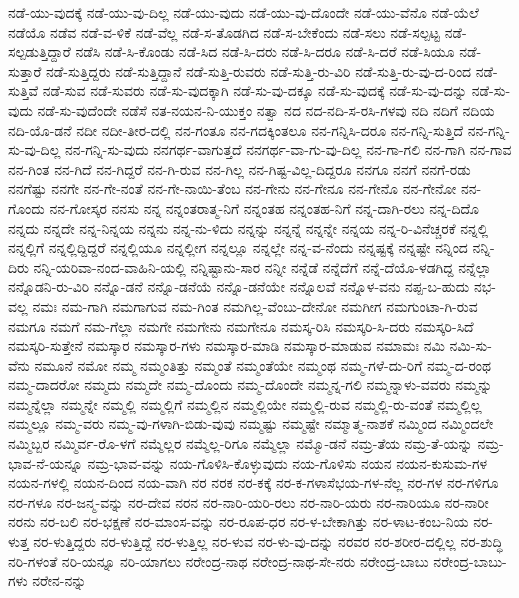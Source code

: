 {ನಡೆ-ಯು-ವುದಕ್ಕೆ
ನಡೆ-ಯು-ವು-ದಿಲ್ಲ
ನಡೆ-ಯು-ವುದು
ನಡೆ-ಯು-ವು-ದೊಂದೇ
ನಡೆ-ಯು-ವೆನೊ
ನಡೆ-ಯೆಲೆ
ನಡೆಯೊ
ನಡೆವ
ನಡೆ-ವ-ಳಿಕೆ
ನಡೆ-ವೆಲ್ಲ
ನಡೆ-ಸ-ತೊಡಗಿದ
ನಡೆ-ಸ-ಬೇಕೆಂದು
ನಡೆ-ಸಲು
ನಡೆ-ಸಲ್ಪಟ್ಟ
ನಡೆ-ಸಲ್ಪಡುತ್ತಿದ್ದಾರೆ
ನಡೆಸಿ
ನಡೆ-ಸಿ-ಕೊಂಡು
ನಡೆ-ಸಿದ
ನಡೆ-ಸಿ-ದರು
ನಡೆ-ಸಿ-ದರೂ
ನಡೆ-ಸಿ-ದರೆ
ನಡೆ-ಸಿಯೂ
ನಡೆ-ಸುತ್ತಾರೆ
ನಡೆ-ಸುತ್ತಿದ್ದರು
ನಡೆ-ಸುತ್ತಿದ್ದಾನೆ
ನಡೆ-ಸುತ್ತಿ-ರುವರು
ನಡೆ-ಸುತ್ತಿ-ರು-ವಿರಿ
ನಡೆ-ಸುತ್ತಿ-ರು-ವು-ದ-ರಿಂದ
ನಡೆ-ಸುತ್ತಿವೆ
ನಡೆ-ಸುವ
ನಡೆ-ಸುವರು
ನಡೆ-ಸು-ವುದಕ್ಕಾಗಿ
ನಡೆ-ಸು-ವು-ದಕ್ಕೂ
ನಡೆ-ಸು-ವುದಕ್ಕೆ
ನಡೆ-ಸು-ವು-ದನ್ನು
ನಡೆ-ಸು-ವುದು
ನಡೆ-ಸು-ವುದೆಂದೇ
ನಡೆಸೆ
ನತ-ನಯನ-ನಿ-ಯುಕ್ತಂ
ನತ್ವಾ
ನದ
ನದ-ನದಿ-ಸ-ರಸಿ-ಗಳವು
ನದಿ
ನದಿಗೆ
ನದಿಯ
ನದಿ-ಯೊ-ಡನೆ
ನದೀ
ನದೀ-ತೀರ-ದಲ್ಲಿ
ನನ-ಗಂತೂ
ನನ-ಗದಕ್ಕಿಂತಲೂ
ನನ-ಗನ್ನಿಸಿ-ದರೂ
ನನ-ಗನ್ನಿ-ಸುತ್ತಿದೆ
ನನ-ಗನ್ನಿ-ಸು-ವು-ದಿಲ್ಲ
ನನ-ಗನ್ನಿ-ಸು-ವುದು
ನನಗರ್ಥ-ವಾಗುತ್ತದೆ
ನನಗರ್ಥ-ವಾ-ಗು-ವು-ದಿಲ್ಲ
ನನ-ಗಾ-ಗಲಿ
ನನ-ಗಾಗಿ
ನನ-ಗಾವ
ನನ-ಗಿಂತ
ನನ-ಗಿದೆ
ನನ-ಗಿದ್ದರೆ
ನನ-ಗಿ-ರುವ
ನನ-ಗಿಲ್ಲ
ನನ-ಗಿಷ್ಟ-ವಿಲ್ಲ-ದಿದ್ದರೂ
ನನಗೂ
ನನಗೆ
ನನಗೆ-ರಡು
ನನಗೆಷ್ಟು
ನನಗೇ
ನನ-ಗೇ-ನಂತೆ
ನನ-ಗೇ-ನಾಯಿ-ತೆಂಬ
ನನ-ಗೇನು
ನನ-ಗೇನೂ
ನನ-ಗೇನೊ
ನನ-ಗೇನೋ
ನನ-ಗೊಂದು
ನನ-ಗೋಸ್ಕರ
ನನಸು
ನನ್ನ
ನನ್ನಂತರಾತ್ಮ-ನಿಗೆ
ನನ್ನಂತಹ
ನನ್ನಂತಹ-ನಿಗೆ
ನನ್ನ-ದಾಗಿ-ರಲು
ನನ್ನ-ದಿದೊ
ನನ್ನದು
ನನ್ನದೇ
ನನ್ನ-ನಿನ್ನಯ
ನನ್ನನು
ನನ್ನ-ನು-ಳಿದು
ನನ್ನನ್ನು
ನನ್ನನ್ನೆ
ನನ್ನನ್ನೇ
ನನ್ನಯ
ನನ್ನ-ರಿ-ವಿನೆಚ್ಚರಕೆ
ನನ್ನಲ್ಲಿ
ನನ್ನಲ್ಲಿಗೆ
ನನ್ನಲ್ಲಿದ್ದಿದ್ದರೆ
ನನ್ನಲ್ಲಿಯೂ
ನನ್ನಲ್ಲೀಗ
ನನ್ನಲ್ಲೂ
ನನ್ನಲ್ಲೇ
ನನ್ನ-ವ-ನೆಂದು
ನನ್ನಷ್ಟಕ್ಕೆ
ನನ್ನಷ್ಟೇ
ನನ್ನಿಂದ
ನನ್ನಿ-ದಿರು
ನನ್ನಿ-ಯರಿವಾ-ನಂದ-ವಾಹಿನಿ-ಯಲ್ಲಿ
ನನ್ನಿಷ್ಟಾನು-ಸಾರ
ನನ್ನೀ
ನನ್ನೆಡೆ
ನನ್ನೆದೆಗೆ
ನನ್ನೆ-ದೆಯೊ-ಳಡಗಿದ್ದ
ನನ್ನೆಲ್ಲಾ
ನನ್ನೊಡನಿ-ರು-ವಿರಿ
ನನ್ನೊ-ಡನೆ
ನನ್ನೊ-ಡನೆಯೆ
ನನ್ನೊ-ಡನೆಯೇ
ನನ್ನೊಲವೆ
ನನ್ನೊಳ-ವನು
ನಪ್ಪ-ಬ-ಹುದು
ನಭ-ವಲ್ಲ
ನಮಃ
ನಮ-ಗಾಗಿ
ನಮಗಾಗುವ
ನಮ-ಗಿಂತ
ನಮಗಿಲ್ಲ-ವೆಂಬು-ದೇನೋ
ನಮಗೀಗ
ನಮಗುಂಟಾ-ಗಿ-ರುವ
ನಮಗೂ
ನಮಗೆ
ನಮ-ಗೆಲ್ಲಾ
ನಮಗೇ
ನಮಗೇನು
ನಮಗೇನೂ
ನಮಸ್ಕ-ರಿಸಿ
ನಮಸ್ಕರಿ-ಸಿ-ದರು
ನಮಸ್ಕರಿ-ಸಿದೆ
ನಮಸ್ಕರಿ-ಸುತ್ತೇನೆ
ನಮಸ್ಕಾರ
ನಮಸ್ಕಾರ-ಗಳು
ನಮಸ್ಕಾರ-ಮಾಡಿ
ನಮಸ್ಕಾರ-ಮಾಡುವ
ನಮಾಮಃ
ನಮಿ
ನಮಿ-ಸು-ವೆನು
ನಮೂನೆ
ನಮೋ
ನಮ್ಮ
ನಮ್ಮಂತಿತ್ತು
ನಮ್ಮಂತೆ
ನಮ್ಮಂತೆಯೇ
ನಮ್ಮಂಥ
ನಮ್ಮ-ಗಳೆ-ದು-ರಿಗೆ
ನಮ್ಮ-ದ-ರಂಥ
ನಮ್ಮ-ದಾದರೋ
ನಮ್ಮದು
ನಮ್ಮದೇ
ನಮ್ಮ-ದೊಂದು
ನಮ್ಮ-ದೊಂದೇ
ನಮ್ಮನ್ನ-ಗಲಿ
ನಮ್ಮನ್ನಾಳು-ವವರು
ನಮ್ಮನ್ನು
ನಮ್ಮನ್ನೆಲ್ಲಾ
ನಮ್ಮನ್ನೇ
ನಮ್ಮಲ್ಲಿ
ನಮ್ಮಲ್ಲಿಗೆ
ನಮ್ಮಲ್ಲಿನ
ನಮ್ಮಲ್ಲಿಯೇ
ನಮ್ಮಲ್ಲಿ-ರುವ
ನಮ್ಮಲ್ಲಿ-ರು-ವಂತೆ
ನಮ್ಮಲ್ಲಿಲ್ಲ
ನಮ್ಮಲ್ಲೂ
ನಮ್ಮ-ವರು
ನಮ್ಮ-ವು-ಗಳಾಗಿ-ಬಿಡು-ವುವು
ನಮ್ಮಷ್ಟು
ನಮ್ಮಷ್ಟೇ
ನಮ್ಮಾತ್ಮ-ನಾಶಕೆ
ನಮ್ಮಿಂದ
ನಮ್ಮಿಂದಲೇ
ನಮ್ಮಿಬ್ಬರ
ನಮ್ಮಿರ್ವ-ರೊ-ಳಗೆ
ನಮ್ಮೆಲ್ಲರ
ನಮ್ಮೆಲ್ಲ-ರಿಗೂ
ನಮ್ಮೆಲ್ಲಾ
ನಮ್ಮೊ-ಡನೆ
ನಮ್ರ-ತೆಯ
ನಮ್ರ-ತೆ-ಯನ್ನು
ನಮ್ರ-ಭಾವ-ನೆ-ಯನ್ನೂ
ನಮ್ರ-ಭಾವ-ವನ್ನು
ನಯ-ಗೊಳಿಸಿ-ಕೊಳ್ಳುವುದು
ನಯ-ಗೊಳಿಸು
ನಯನ
ನಯನ-ಕುಸುಮ-ಗಳ
ನಯನ-ಗಳಲ್ಲಿ
ನಯನ-ದಿಂದ
ನಯ-ವಾಗಿ
ನರ
ನರಕ
ನರ-ಕಕ್ಕೆ
ನರ-ಕ-ಗಳಾಸೆಭಯ-ಗಳ-ನೆಲ್ಲ
ನರ-ಗಳ
ನರ-ಗಳಿಗೂ
ನರ-ಗಳೂ
ನರ-ಜನ್ಮ-ವನ್ನು
ನರ-ದೇವ
ನರನ
ನರ-ನಾರಿ-ಯರಿ-ರಲು
ನರ-ನಾರಿ-ಯರು
ನರ-ನಾರಿಯೂ
ನರ-ನಾರೀ
ನರನು
ನರ-ಬಲಿ
ನರ-ಭಕ್ಷಣೆ
ನರ-ಮಾಂಸ-ವನ್ನು
ನರ-ರೂಪ-ಧರ
ನರ-ಳ-ಬೇಕಾಗಿತ್ತು
ನರ-ಳಾಟ-ಕಂಬ-ನಿಯ
ನರ-ಳುತ್ತ
ನರ-ಳುತ್ತಿದ್ದರು
ನರ-ಳುತ್ತಿದ್ದೆ
ನರ-ಳುತ್ತಿಲ್ಲ
ನರ-ಳುವ
ನರ-ಳು-ವು-ದನ್ನು
ನರವರ
ನರ-ಶರೀರ-ದಲ್ಲಿಲ್ಲ
ನರ-ಶುದ್ಧಿ
ನರಿ-ಗಳಂತೆ
ನರಿ-ಯನ್ನೂ
ನರಿ-ಯಾಗಲು
ನರೇಂದ್ರ-ನಾಥ
ನರೇಂದ್ರ-ನಾಥ-ಸೇ-ನರು
ನರೇಂದ್ರ-ಬಾಬು
ನರೇಂದ್ರ-ಬಾಬು-ಗಳು
ನರೇನ-ನನ್ನು
}
